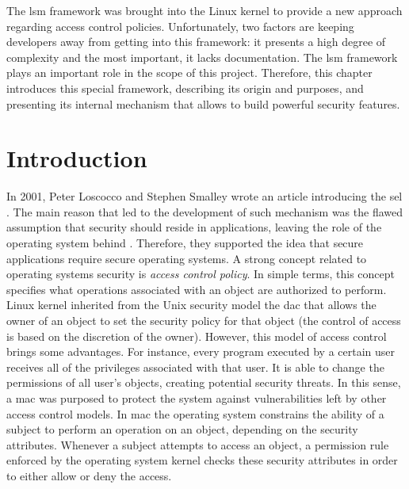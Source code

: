 The \gls{lsm} framework was brought into the Linux kernel to provide a new approach regarding access control policies. Unfortunately, two factors are keeping developers away from getting into this framework: it presents a high degree of complexity and the most important, it lacks documentation. The \gls{lsm} framework plays an important role in the scope of this project. Therefore, this chapter introduces this special framework, describing its origin and purposes, and presenting its internal mechanism that allows to build powerful security features.

\section{Introduction}

In 2001, Peter Loscocco and Stephen Smalley wrote an article introducing the \gls{sel} \cite{LS01}. The main reason that led to the development of such mechanism was the flawed assumption that security should reside in applications, leaving the role of the operating system behind \cite{LSMTTF98}. Therefore, they supported the idea that secure applications require secure operating systems. A strong concept related to operating systems security is \textit{access control policy}. In simple terms, this concept specifies what operations associated with an object are authorized to perform. Linux kernel inherited from the Unix security model the \gls{dac} that allows the owner of an object to set the security policy for that object (the control of access is based on the discretion of the owner). However, this model of access control brings some advantages. For instance, every program executed by a certain user receives all of the privileges associated with that user. It is able to change the permissions of all user's objects, creating potential security threats. In this sense, a \gls{mac} was purposed to protect the system against vulnerabilities left by other access control models. In \gls{mac} the operating system constrains the ability of a subject to perform an operation on an object, depending on the security attributes. Whenever a subject attempts to access an object, a permission rule enforced by the operating system kernel checks these security attributes in order to either allow or deny the access.

